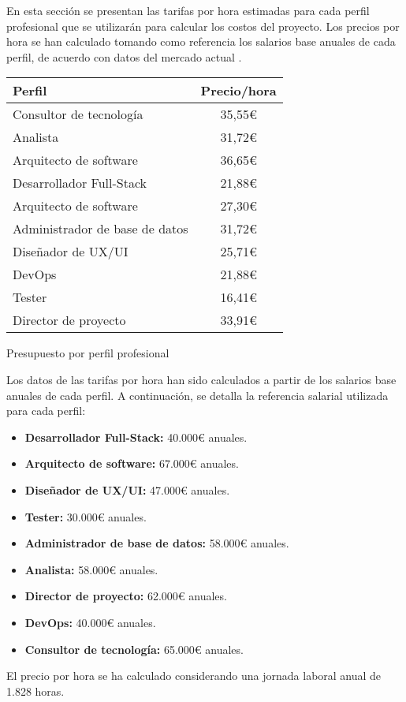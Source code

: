 En esta sección se presentan las tarifas por hora estimadas para cada perfil profesional que se utilizarán para calcular los costos del proyecto.
Los precios por hora se han calculado tomando como referencia los salarios base anuales de cada perfil, de acuerdo con datos del mercado actual \cite{manfred2023}.
\begin{planificacion}
	\centering
	\begin{tabular}{ | m{9cm} | c | }
		\hline
		\textbf{Perfil}                & \textbf{Precio/hora} \\\hline
		Consultor de tecnología        & 35,55€               \\\hline
		Analista                       & 31,72€               \\\hline
		Arquitecto de software         & 36,65€               \\\hline
		Desarrollador Full-Stack       & 21,88€               \\\hline
		Arquitecto de software         & 27,30€               \\\hline
		Administrador de base de datos & 31,72€               \\\hline
		Diseñador de UX/UI             & 25,71€               \\\hline
		DevOps                         & 21,88€               \\\hline
		Tester                         & 16,41€               \\\hline
		Director de proyecto           & 33,91€               \\\hline
	\end{tabular}
	\caption{Presupuesto por perfil profesional}
\end{planificacion}

Los datos de las tarifas por hora han sido calculados a partir de los salarios base anuales de cada perfil.
A continuación, se detalla la referencia salarial utilizada para cada perfil:
\begin{itemize}
	\item  \textbf{Desarrollador Full-Stack:} 40.000€ anuales.
	\item  \textbf{Arquitecto de software:} 67.000€ anuales.
	\item  \textbf{Diseñador de UX/UI:} 47.000€ anuales.
	\item  \textbf{Tester:} 30.000€ anuales.
	\item  \textbf{Administrador de base de datos:} 58.000€ anuales.
	\item  \textbf{Analista:} 58.000€ anuales.
	\item  \textbf{Director de proyecto:} 62.000€ anuales.
	\item  \textbf{DevOps:} 40.000€ anuales.
	\item  \textbf{Consultor de tecnología:} 65.000€ anuales.
\end{itemize}
El precio por hora se ha calculado considerando una jornada laboral anual de 1.828 horas.
